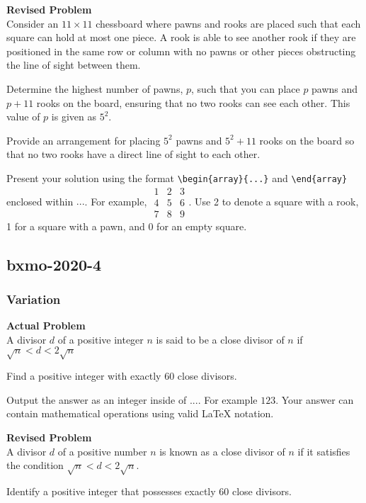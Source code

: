 \textbf{Revised Problem}\\
Consider an $11 \times 11$ chessboard where pawns and rooks are placed such that each square can hold at most one piece. A rook is able to see another rook if they are positioned in the same row or column with no pawns or other pieces obstructing the line of sight between them.

Determine the highest number of pawns, $p$, such that you can place $p$ pawns and $p + 11$ rooks on the board, ensuring that no two rooks can see each other. This value of $p$ is given as $5^2$.

Provide an arrangement for placing $5^2$ pawns and $5^2 + 11$ rooks on the board so that no two rooks have a direct line of sight to each other.

Present your solution using the format \verb|\begin{array}{...}| and \verb|\end{array}| enclosed within $\boxed{...}$. For example, $\boxed{\begin{array}{ccc}1 & 2 & 3 \\ 4 & 5 & 6 \\ 7 & 8 & 9\end{array}}$.
Use 2 to denote a square with a rook, 1 for a square with a pawn, and 0 for an empty square.

\subsection{bxmo-2020-4}
\subsubsection{Variation}
\textbf{Actual Problem}\\
A divisor $d$ of a positive integer $n$ is said to be a close divisor of $n$ if $\sqrt{n} < d < 2\sqrt{n}$

Find a positive integer with exactly 60 close divisors.

Output the answer as an integer inside of $\boxed{...}$. For example $\boxed{123}$.
Your answer can contain mathematical operations using valid LaTeX notation.

\textbf{Revised Problem}\\
A divisor \( d \) of a positive number \( n \) is known as a close divisor of \( n \) if it satisfies the condition \( \sqrt{n} < d < 2\sqrt{n} \).

Identify a positive integer that possesses exactly 60 close divisors.

